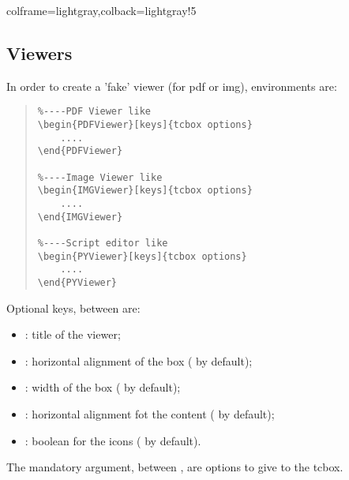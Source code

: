 \documentclass[11pt,a4paper]{ltxdoc}
\begin{document}
\begin{tcblisting}{colframe=lightgray,colback=lightgray!5}
\end{tcblisting}

\pagebreak

\subsection{Viewers}

In order to create a 'fake' viewer (for \textsf{pdf} or \textsf{img}), environments are:

\begin{quote}
\begin{verbatim}
%----PDF Viewer like
\begin{PDFViewer}[keys]{tcbox options}
    ....
\end{PDFViewer}

%----Image Viewer like
\begin{IMGViewer}[keys]{tcbox options}
    ....
\end{IMGViewer}

%----Script editor like
\begin{PYViewer}[keys]{tcbox options}
    ....
\end{PYViewer}
\end{verbatim}
\end{quote}

Optional keys, between \MontreCode{[...]} are:

\begin{itemize}
	\item {}: title of the viewer;
	\item {}: horizontal alignment of the box ( by default);
	\item {}: width of the box ( by default);
	\item {}: horizontal alignment fot the content ( by default);
	\item {}: boolean for the icons ( by default).
\end{itemize}

\medskip

The mandatory argument, between , are options to give to the tcbox.
\end{document}
